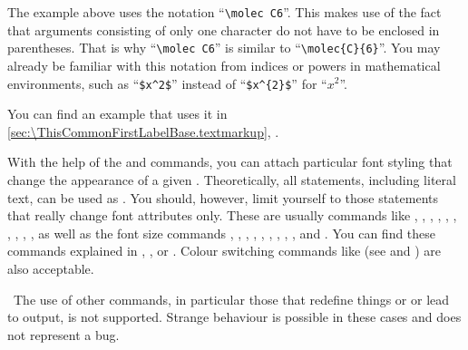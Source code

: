     \iftrue
      \begin{Explain}
        The example above uses the notation ``\verb|\molec C6|''. 
        This makes use of the fact that arguments consisting of only one
        character do not have to be enclosed in parentheses. That is why
        ``\verb|\molec C6|'' is similar to ``\verb|\molec{C}{6}|''. You
        may already be familiar with this notation from indices or powers in
        mathematical environments, such as ``\verb|$x^2$|'' instead of
        ``\verb|$x^{2}$|''
        for ``$x^2$''.
      \end{Explain}
    \else %
      Advanced users can find information about the reason the example above
      does work unless you put all arguments of \Macro{molec} into braces in
      \autoref{sec:experts.knowhow},
      \DescPageRef{experts.macroargs}.%
    \fi%
  \else%
    You can find an example that uses it in
    \autoref{sec:\ThisCommonFirstLabelBase.textmarkup},
    .
  \fi%
  \EndIndexGroup%
\fi


\begin{Declaration}
\end{Declaration}%
With%
 the help of the  and 
commands, you can attach particular font styling  that change
the appearance of a given . Theoretically, all statements,
including literal text, can be used as . You
should, however, limit yourself to those statements that
really change font attributes only. These are usually commands like
, , , ,
, , , ,
, , as well as the font size commands
, , , , ,
, , , ,
and . You can find these commands explained in \cite{lshort},
\cite{latex:usrguide}, or \cite{latex:fntguide}. Colour switching commands
like  (see \cite{package:graphics} and
\cite{package:xcolor}) are also acceptable.%
\iffalse %
  \ The behaviour when using other commands, especially those that lead to
  redefinitions or generate output, is undefined. Strange behaviour is possible
  and does not represent a bug.
\else
  \ The use of other commands, in particular those that redefine things or
  or lead to output, is not supported. Strange behaviour is possible in these
  cases and does not represent a bug.
\fi

